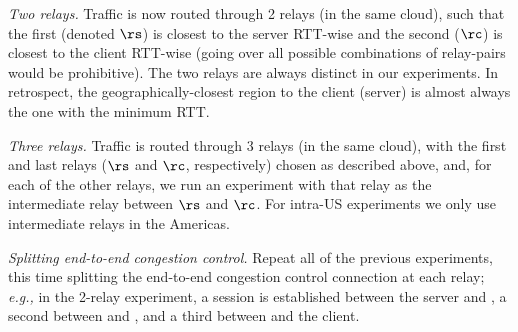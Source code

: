 \documentclass[10pt,sigconf]{acmart}
\newcommand{\mycomm}[3]{{\color{#2} \textbf{[#1: #3]}}}
\newcommand{\mycomm}[3]{}
\newcommand{\IK}[1]{\mycomm{IK}{blue}{#1}}
\newcommand{\AB}[1]{\mycomm{AB}{orange}{#1}}
\newcommand{\NR}[1]{\mycomm{NR}{violet}{#1}}
\providecommand{\eg}{\emph{e.g.,} }
\newcommand{\PST}[1]{\smallskip\noindent\textit{#1}} %
\begin{document}

\PST{Two relays.} Traffic is now routed through 2 relays (in the same cloud), such that the first (denoted $\rs$) is closest to the server RTT-wise and the second ($\rc$) is closest to the client RTT-wise (going over all possible combinations of relay-pairs would be prohibitive). The two relays are always distinct in our experiments. %
In retrospect, the geographically-closest region to the client (server) is almost always the one with the minimum RTT.


\PST{Three relays.} Traffic is routed through 3 relays (in the same cloud), with the first and last relays ($\rs$ and $\rc$, respectively) chosen as described above, and, for each of the other relays, we run an experiment with that relay as the intermediate relay between $\rs$ and $\rc$. For intra-US experiments we only use intermediate relays in the Americas.

\PST{Splitting end-to-end congestion control.} Repeat all of the previous experiments, this time splitting the end-to-end congestion control connection at each relay; \eg in the 2-relay experiment, a session is established between the server and \rs, a second between \rs and \rc, and a third between \rc and the client.
\end{document}
